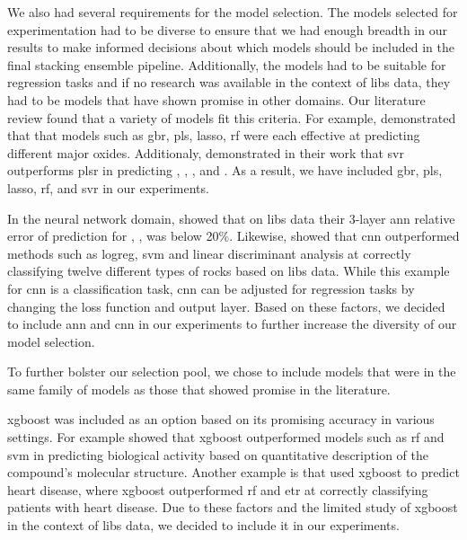We also had several requirements for the model selection.
The models selected for experimentation had to be diverse to ensure that we had enough breadth in our results to make informed decisions about which models should be included in the final stacking ensemble pipeline.
Additionally, the models had to be suitable for regression tasks and if no research was available in the context of \gls{libs} data, they had to be models that have shown promise in other domains.
Our literature review found that a variety of models fit this criteria.
For example, \citet{andersonPostlandingMajorElement2022} demonstrated that that models such as \gls{gbr}, \gls{pls}, \gls{lasso}, \gls{rf} were each effective at predicting different major oxides.
Additionaly, \citet{svrforlibs} demonstrated in their work that \gls{svr} outperforms \gls{plsr} in predicting , , ,  and .
As a result, we have included \gls{gbr}, \gls{pls}, \gls{lasso}, \gls{rf}, and \gls{svr} in our experiments.

In the neural network domain, \cite{ann_libs_soil_analysis} showed that on \gls{libs} data their 3-layer \gls{ann} relative error of prediction for , ,  was below 20\%.
Likewise, \citet{yangConvolutionalNeuralNetwork2022} showed that \gls{cnn} outperformed methods such as \gls{logreg}, \gls{svm} and linear discriminant analysis at correctly classifying twelve different types of rocks based on \gls{libs} data. 
While this example for \gls{cnn} is a classification task, \gls{cnn} can be adjusted for regression tasks by changing the loss function and output layer.
Based on these factors, we decided to include \gls{ann} and \gls{cnn} in our experiments to further increase the diversity of our model selection.

To further bolster our selection pool, we chose to include models that were in the same family of models as those that showed promise in the literature.

\gls{xgboost} was included as an option based on its promising accuracy in various settings.
For example \citet{xgboost_in_biomedicie} showed that \gls{xgboost} outperformed models such as \gls{rf} and \gls{svm} in predicting biological activity based on quantitative description of the compound's molecular structure. 
Another example is \citet{xgboost_in_heart_disease} that used \gls{xgboost} to predict heart disease, where \gls{xgboost} outperformed \gls{rf} and \gls{etr} at correctly classifying patients with heart disease.
Due to these factors and the limited study of \gls{xgboost} in the context of \gls{libs} data, we decided to include it in our experiments.

